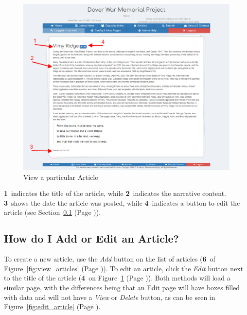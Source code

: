 \documentclass[12pt]{article}
\newcommand{\marker}[1]{\color{red}\textbf{#1}\color{black}}
\newcommand{\myref}[1]{\ref{#1} {\scriptsize(Page \pageref{#1})}}
\begin{document}
\begin{figure}[h]
  \centering
 \includegraphics[width=.9\textwidth]{pics/view_article.png}
	\caption{View a particular Article}\label{fig:view_article}
\end{figure}

\marker{1}\ indicates the title of the article, while \marker{2}\ indicates the narrative content. \marker{3}\ shows the date the article was posted, while \marker{4}\ indicates a button to edit the article (see Section~\myref{ssec:edit_article}).

\newpage
\FloatBarrier
\subsection{How do I Add or Edit an Article?}\label{ssec:edit_article}
To create a new article, use the \textit{Add} button on the list of articles (\marker{6}\ of Figure~\myref{fig:view_articles}). To edit an article, click the \textit{Edit} button next to the title of the article (\marker{4}\ on Figure~\myref{fig:view_article}). Both methods will load a similar page, with the differences being that an Edit page will have boxes filled with data and will not have a \textit{View} or \textit{Delete} button, as can be seen in Figure~\myref{fig:edit_article}.
\end{document}

